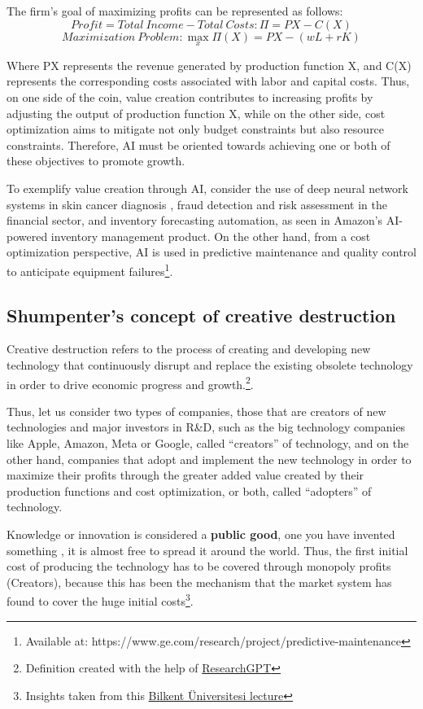 \documentclass[preprint, 3p,
authoryear]{elsarticle} %
\begin{document}
The firm's goal of maximizing profits can be represented as follows: \[
Profit = Total \ Income - Total \ Costs: \Pi = PX - C(X)
\] \[
Maximization \ Problem: \max_{x} \Pi(X) = PX - (wL + rK)
\]

Where PX represents the revenue generated by production function X, and
C(X) represents the corresponding costs associated with labor and
capital costs. Thus, on one side of the coin, value creation contributes
to increasing profits by adjusting the output of production function X,
while on the other side, cost optimization aims to mitigate not only
budget constraints but also resource constraints. Therefore, AI must be
oriented towards achieving one or both of these objectives to promote
growth.

To exemplify value creation through AI, consider the use of deep neural
network systems in skin cancer diagnosis \citep{cancer}, fraud detection
and risk assessment in the financial sector, and inventory forecasting
automation, as seen in Amazon's AI-powered inventory management product.
On the other hand, from a cost optimization perspective, AI is used in
predictive maintenance and quality control to anticipate equipment
failures\footnote{Available at:
  https://www.ge.com/research/project/predictive-maintenance}.

\hypertarget{shumpenters-concept-of-creative-destruction}{%
\subsection{Shumpenter's concept of creative
destruction}\label{shumpenters-concept-of-creative-destruction}}

Creative destruction refers to the process of creating and developing
new technology that continuously disrupt and replace the existing
obsolete technology in order to drive economic progress and
growth.\footnote{Definition created with the help of
  \href{https://github.com/mukulpatnaik/researchgpt.git}{ResearchGPT}}.

Thus, let us consider two types of companies, those that are creators of
new technologies and major investors in R\&D, such as the big technology
companies like Apple, Amazon, Meta or Google, called ``creators'' of
technology, and on the other hand, companies that adopt and implement
the new technology in order to maximize their profits through the
greater added value created by their production functions and cost
optimization, or both, called ``adopters'' of technology.

Knowledge or innovation is considered a \textbf{public good}, one you
have invented something , it is almost free to spread it around the
world. Thus, the first initial cost of producing the technology has to
be covered through monopoly profits (Creators), because this has been
the mechanism that the market system has found to cover the huge initial
costs\footnote{Insights taken from this
  \href{https://youtu.be/m3nkTrFF2zs?si=dgPJlvVgQuuQAcL8}{Bilkent
  Üniversitesi lecture}}.
\end{document}
